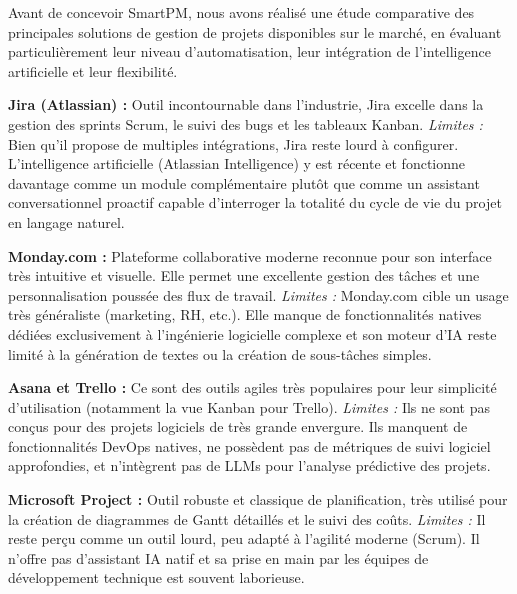 Avant de concevoir SmartPM, nous avons réalisé une étude comparative des principales
solutions de gestion de projets disponibles sur le marché, en évaluant particulièrement 
leur niveau d'automatisation, leur intégration de l'intelligence artificielle et leur flexibilité.

\vspace{0.3cm}

\textbf{Jira (Atlassian) :} Outil incontournable dans l'industrie, Jira excelle dans la gestion des sprints Scrum, le suivi des bugs et les tableaux Kanban. 
\textit{Limites :} Bien qu'il propose de multiples intégrations, Jira reste lourd à configurer. L'intelligence artificielle (Atlassian Intelligence) y est récente et fonctionne davantage comme un module complémentaire plutôt que comme un assistant conversationnel proactif capable d'interroger la totalité du cycle de vie du projet en langage naturel.

\vspace{0.3cm}

\textbf{Monday.com :} Plateforme collaborative moderne reconnue pour son interface très intuitive et visuelle. Elle permet une excellente gestion des tâches et une personnalisation poussée des flux de travail.
\textit{Limites :} Monday.com cible un usage très généraliste (marketing, RH, etc.). Elle manque de fonctionnalités natives dédiées exclusivement à l'ingénierie logicielle complexe et son moteur d'IA reste limité à la génération de textes ou la création de sous-tâches simples.

\vspace{0.3cm}

\textbf{Asana et Trello :} Ce sont des outils agiles très populaires pour leur simplicité d'utilisation (notamment la vue Kanban pour Trello).
\textit{Limites :} Ils ne sont pas conçus pour des projets logiciels de très grande envergure. Ils manquent de fonctionnalités DevOps natives, ne possèdent pas de métriques de suivi logiciel approfondies, et n'intègrent pas de LLMs pour l'analyse prédictive des projets.

\vspace{0.3cm}

\textbf{Microsoft Project :} Outil robuste et classique de planification, très utilisé pour la création de diagrammes de Gantt détaillés et le suivi des coûts.
\textit{Limites :} Il reste perçu comme un outil lourd, peu adapté à l'agilité moderne (Scrum). Il n'offre pas d'assistant IA natif et sa prise en main par les équipes de développement technique est souvent laborieuse.

